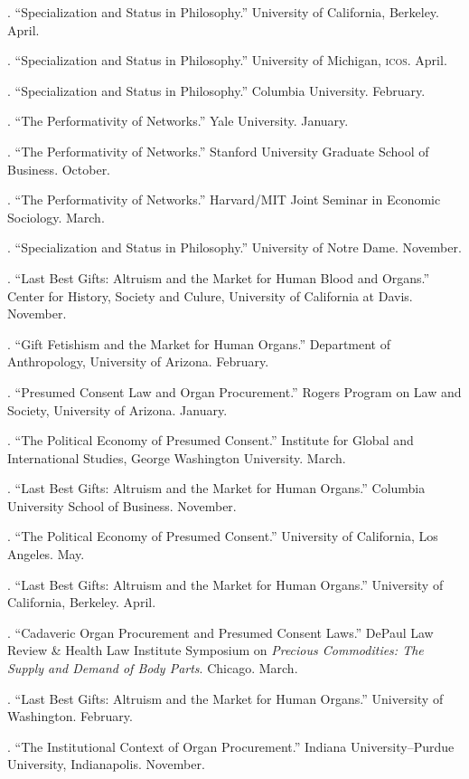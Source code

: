 \documentclass[11pt]{article}
\begin{document}
. ``Specialization and Status in Philosophy.'' University of California, Berkeley. April. 

. ``Specialization and Status in Philosophy.'' University of Michigan, \textsc{icos}. April.

. ``Specialization and Status in Philosophy.'' Columbia University. February. 

. ``The Performativity of Networks.'' Yale University. January.

. ``The Performativity of Networks.'' Stanford University Graduate School of Business. October. 

. ``The Performativity of Networks.'' Harvard/MIT Joint Seminar in Economic Sociology. March.

. ``Specialization and Status in Philosophy.'' University of Notre Dame. November. 

. ``Last Best Gifts: Altruism and the Market for Human Blood and Organs.'' Center for History, Society and Culure, University of California at Davis. November.

. ``Gift Fetishism and the Market for Human Organs.'' Department of Anthropology, University of Arizona. February. 

. ``Presumed Consent Law and Organ Procurement.'' Rogers Program on Law and Society, University of Arizona. January. 

. ``The Political Economy of Presumed Consent.'' Institute for Global
and International Studies, George Washington University. March.

. ``Last Best Gifts: Altruism and the Market for Human Organs.''
Columbia University School of Business. November. 

. ``The Political Economy of Presumed Consent.'' University of California, Los Angeles. May.

. ``Last Best Gifts: Altruism and the Market for Human Organs.''
University of California, Berkeley. April.

. ``Cadaveric Organ Procurement and Presumed Consent Laws.'' DePaul
Law Review \& Health Law Institute Symposium on \emph{Precious Commodities: The
Supply and Demand of Body Parts}. Chicago. March. 

. ``Last Best Gifts: Altruism and the Market for Human 
Organs.'' University of Washington. February. 

. ``The Institutional Context of Organ Procurement.'' Indiana
University--Purdue University, Indianapolis. November.
\end{document}

